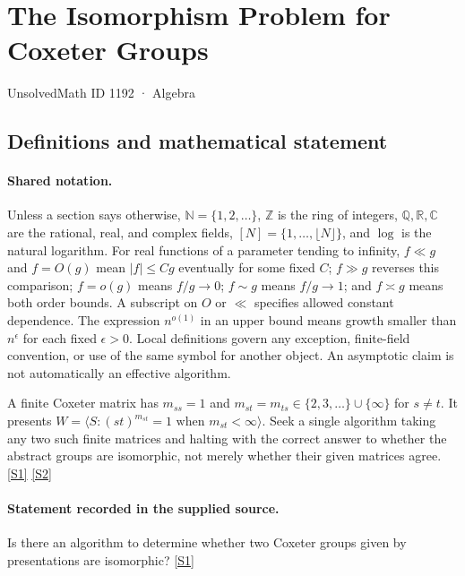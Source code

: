 \documentclass[11pt,a4paper]{article}
\newcommand{\N}{\mathbb{N}}
\newcommand{\Z}{\mathbb{Z}}
\newcommand{\Q}{\mathbb{Q}}
\newcommand{\R}{\mathbb{R}}
\newcommand{\C}{\mathbb{C}}
\newcommand{\sref}[2]{\hyperlink{source:#1:#2}{[S#2]}}
\begin{document}

\setcounter{section}{1191}

\section{The Isomorphism Problem for Coxeter Groups}\label{1192}

{\small\sffamily UnsolvedMath ID 1192 · Algebra}

\subsection{Definitions and mathematical statement}

\paragraph{Shared notation.}Unless a section says otherwise, $\N=\{1,2,\ldots\}$,
$\Z$ is the ring of integers, $\Q,\R,\C$ are the rational, real, and complex
fields, $[N]=\{1,\ldots,\lfloor N\rfloor\}$, and $\log$ is the natural
logarithm. For real functions of a parameter tending to infinity,
$f\ll g$ and $f=O(g)$ mean $|f|\leq Cg$ eventually for some fixed $C$;
$f\gg g$ reverses this comparison; $f=o(g)$ means $f/g\to0$;
$f\sim g$ means $f/g\to1$; and $f\asymp g$ means both order bounds.
A subscript on $O$ or $\ll$ specifies allowed constant dependence.
The expression $n^{o(1)}$ in an upper bound means growth smaller than
$n^\epsilon$ for each fixed $\epsilon>0$. Local definitions govern any
exception, finite-field convention, or use of the same symbol for another
object. An asymptotic claim is not automatically an effective algorithm.



A finite Coxeter matrix has $m_{ss}=1$ and $m_{st}=m_{ts}\in\{2,3,\ldots\}\cup\{\infty\}$ for $s\ne t$. It presents $W=\langle S:(st)^{m_{st}}=1\text{ when }m_{st}<\infty\rangle$. Seek a single algorithm taking any two such finite matrices and halting with the correct answer to whether the abstract groups are isomorphic, not merely whether their given matrices agree. \sref{1192}{1} \sref{1192}{2}

\paragraph{Statement recorded in the supplied source.}
Is there an algorithm to determine whether two Coxeter groups given by presentations are isomorphic? \sref{1192}{1}
\end{document}
